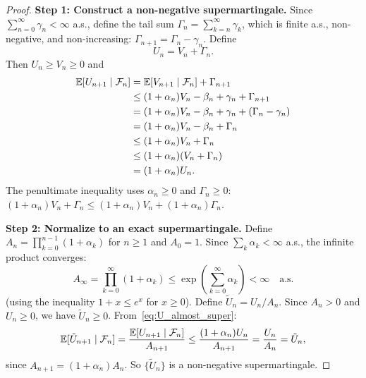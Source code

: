 \documentclass[11pt,a4paper]{article}
\begin{document}
\begin{proof}
\textbf{Step 1: Construct a non-negative supermartingale.}
Since $\sum_{n=0}^\infty \gamma_n < \infty$ a.s., define the tail
sum $\Gamma_n = \sum_{k=n}^\infty \gamma_k$, which is finite
a.s., non-negative, and non-increasing:
$\Gamma_{n+1} = \Gamma_n - \gamma_n$.  Define
\begin{equation}
  U_n = V_n + \Gamma_n.
  \label{eq:U_def}
\end{equation}
Then $U_n \geq V_n \geq 0$ and
\begin{align}
  \mathbb{E}[U_{n+1} \mid \mathcal{F}_n]
  &= \mathbb{E}[V_{n+1} \mid \mathcal{F}_n]
    + \Gamma_{n+1}
  \nonumber\\
  &\leq (1 + \alpha_n) V_n - \beta_n + \gamma_n
    + \Gamma_{n+1}
  \nonumber\\
  &= (1 + \alpha_n) V_n - \beta_n
    + \gamma_n + (\Gamma_n - \gamma_n)
  \nonumber\\
  &= (1 + \alpha_n) V_n - \beta_n + \Gamma_n
  \nonumber\\
  &\leq (1 + \alpha_n) V_n + \Gamma_n
  \nonumber\\
  &\leq (1 + \alpha_n)(V_n + \Gamma_n)
  \nonumber\\
  &= (1 + \alpha_n) U_n.
  \label{eq:U_almost_super}
\end{align}
The penultimate inequality uses $\alpha_n \geq 0$ and
$\Gamma_n \geq 0$:
$(1 + \alpha_n) V_n + \Gamma_n \leq (1 + \alpha_n) V_n +
(1 + \alpha_n) \Gamma_n$.

\textbf{Step 2: Normalize to an exact supermartingale.}
Define $A_n = \prod_{k=0}^{n-1}(1 + \alpha_k)$ for $n \geq 1$
and $A_0 = 1$.  Since $\sum_k \alpha_k < \infty$ a.s., the
infinite product converges:
\begin{equation}
  A_\infty = \prod_{k=0}^\infty (1 + \alpha_k)
  \leq \exp\!\left(\sum_{k=0}^\infty \alpha_k\right)
  < \infty \quad \text{a.s.}
  \label{eq:product_bound}
\end{equation}
(using the inequality $1 + x \leq e^x$ for $x \geq 0$).
Define $\tilde{U}_n = U_n / A_n$.  Since $A_n > 0$ and
$U_n \geq 0$, we have $\tilde{U}_n \geq 0$.
From~\eqref{eq:U_almost_super}:
\begin{equation}
  \mathbb{E}[\tilde{U}_{n+1} \mid \mathcal{F}_n]
  = \frac{\mathbb{E}[U_{n+1} \mid \mathcal{F}_n]}{A_{n+1}}
  \leq \frac{(1 + \alpha_n) U_n}{A_{n+1}}
  = \frac{U_n}{A_n}
  = \tilde{U}_n,
  \label{eq:exact_supermartingale}
\end{equation}
since $A_{n+1} = (1 + \alpha_n) A_n$.  So $\{\tilde{U}_n\}$ is
a non-negative supermartingale.


\end{proof}
\end{document}
